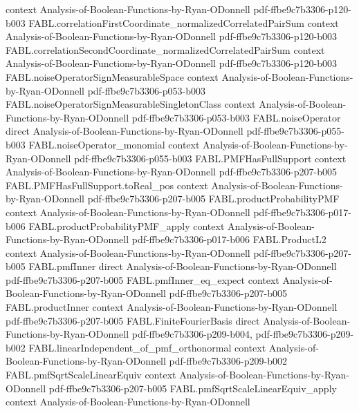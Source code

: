 \begin{theorem}
  {context}
  {Analysis-of-Boolean-Functions-by-Ryan-ODonnell}
  {pdf-ffbe9c7b3306-p120-b003}
\proofstep
  {FABL.correlationFirstCoordinate_normalizedCorrelatedPairSum}
  {context}
  {Analysis-of-Boolean-Functions-by-Ryan-ODonnell}
  {pdf-ffbe9c7b3306-p120-b003}
\proofstep
  {FABL.correlationSecondCoordinate_normalizedCorrelatedPairSum}
  {context}
  {Analysis-of-Boolean-Functions-by-Ryan-ODonnell}
  {pdf-ffbe9c7b3306-p120-b003}
\proofstep
  {FABL.noiseOperatorSignMeasurableSpace}
  {context}
  {Analysis-of-Boolean-Functions-by-Ryan-ODonnell}
  {pdf-ffbe9c7b3306-p053-b003}
\proofstep
  {FABL.noiseOperatorSignMeasurableSingletonClass}
  {context}
  {Analysis-of-Boolean-Functions-by-Ryan-ODonnell}
  {pdf-ffbe9c7b3306-p053-b003}
\proofstep
  {FABL.noiseOperator}
  {direct}
  {Analysis-of-Boolean-Functions-by-Ryan-ODonnell}
  {pdf-ffbe9c7b3306-p055-b003}
\proofstep
  {FABL.noiseOperator_monomial}
  {context}
  {Analysis-of-Boolean-Functions-by-Ryan-ODonnell}
  {pdf-ffbe9c7b3306-p055-b003}
\proofstep
  {FABL.PMFHasFullSupport}
  {context}
  {Analysis-of-Boolean-Functions-by-Ryan-ODonnell}
  {pdf-ffbe9c7b3306-p207-b005}
\proofstep
  {FABL.PMFHasFullSupport.toReal_pos}
  {context}
  {Analysis-of-Boolean-Functions-by-Ryan-ODonnell}
  {pdf-ffbe9c7b3306-p207-b005}
\proofstep
  {FABL.productProbabilityPMF}
  {context}
  {Analysis-of-Boolean-Functions-by-Ryan-ODonnell}
  {pdf-ffbe9c7b3306-p017-b006}
\proofstep
  {FABL.productProbabilityPMF_apply}
  {context}
  {Analysis-of-Boolean-Functions-by-Ryan-ODonnell}
  {pdf-ffbe9c7b3306-p017-b006}
\proofstep
  {FABL.ProductL2}
  {context}
  {Analysis-of-Boolean-Functions-by-Ryan-ODonnell}
  {pdf-ffbe9c7b3306-p207-b005}
\proofstep
  {FABL.pmfInner}
  {direct}
  {Analysis-of-Boolean-Functions-by-Ryan-ODonnell}
  {pdf-ffbe9c7b3306-p207-b005}
\proofstep
  {FABL.pmfInner_eq_expect}
  {context}
  {Analysis-of-Boolean-Functions-by-Ryan-ODonnell}
  {pdf-ffbe9c7b3306-p207-b005}
\proofstep
  {FABL.productInner}
  {context}
  {Analysis-of-Boolean-Functions-by-Ryan-ODonnell}
  {pdf-ffbe9c7b3306-p207-b005}
\proofstep
  {FABL.FiniteFourierBasis}
  {direct}
  {Analysis-of-Boolean-Functions-by-Ryan-ODonnell}
  {pdf-ffbe9c7b3306-p209-b004,
    pdf-ffbe9c7b3306-p209-b002}
\proofstep
  {FABL.linearIndependent_of_pmf_orthonormal}
  {context}
  {Analysis-of-Boolean-Functions-by-Ryan-ODonnell}
  {pdf-ffbe9c7b3306-p209-b002}
\proofstep
  {FABL.pmfSqrtScaleLinearEquiv}
  {context}
  {Analysis-of-Boolean-Functions-by-Ryan-ODonnell}
  {pdf-ffbe9c7b3306-p207-b005}
\proofstep
  {FABL.pmfSqrtScaleLinearEquiv_apply}
  {context}
  {Analysis-of-Boolean-Functions-by-Ryan-ODonnell}

\end{theorem}
